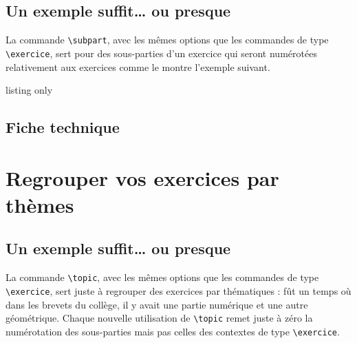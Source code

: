 \documentclass[12pt,a4paper]{scrartcl}
\begin{document}
    \subsection{Un exemple suffit\dots{} ou presque}

La commande \verb+\subpart+, avec les mêmes options que les commandes de type \verb+\exercice+, sert pour des sous-parties d'un exercice qui seront numérotées relativement aux exercices comme le montre l'exemple suivant.

\resetallcnt{}

\begin{tcblisting}{listing only}
\exercise
\subpart
\subpart

\exercise
\subpart
\subpart
\end{tcblisting}

\examplestart{}
\exercise
\subpart
\subpart

\exercise
\subpart
\subpart
\exampleend{}


    \subsection{Fiche technique}

\exosoptionsdescription{}

\bigskip





\exosoptions{}



\section{Regrouper vos exercices par thèmes}

    \subsection{Un exemple suffit\dots{} ou presque}

La commande \verb+\topic+, avec les mêmes options que les commandes de type \verb+\exercice+, sert juste à regrouper des exercices par thématiques : fût un temps où dans les brevets du collège, il y avait une partie numérique et une autre géométrique.
Chaque nouvelle utilisation de \verb+\topic+ remet juste à zéro la numérotation des sous-parties mais pas celles des contextes de type \verb+\exercice+.
\end{document}
